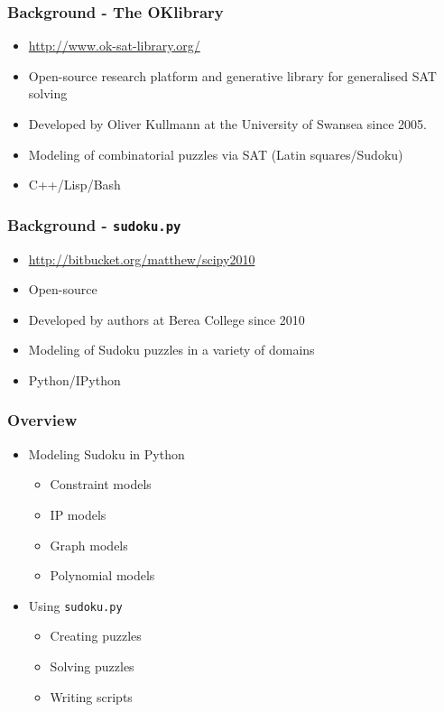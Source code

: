 \documentclass{beamer}
\title{\talktitle}
\author{\Us}
\date{\talkdate}
\begin{document}
\begin{frame}
  \titlepage
  \conferencebanner
\end{frame}

\begin{frame}
\frametitle{Background - The OKlibrary}
 \begin{itemize}
  \item<1-> \url{http://www.ok-sat-library.org/}
  \item<2-> Open-source research platform and generative library for generalised SAT solving
  \item<3-> Developed by Oliver Kullmann at the University of Swansea since 2005.
  \item<4-> Modeling of combinatorial puzzles via SAT (Latin squares/Sudoku)
  \item<5-> C++/Lisp/Bash
 \end{itemize}
\end{frame}

\begin{frame}
\frametitle{Background - \texttt{sudoku.py}}
 \begin{itemize}
  \item<1-> \url{http://bitbucket.org/matthew/scipy2010}
  \item<2-> Open-source 
  \item<3-> Developed by authors at Berea College since 2010
  \item<4-> Modeling of Sudoku puzzles in a variety of domains
  \item<5-> Python/IPython
 \end{itemize}
\end{frame}

\begin{frame}
\frametitle{Overview}
 \begin{itemize}
  \item<1-> {Modeling Sudoku in Python
    \begin{itemize}
      \item<2-> Constraint models
      \item<3-> IP models
      \item<4-> Graph models
      \item<5-> Polynomial models
    \end{itemize}}
  \item<6-> {Using \texttt{sudoku.py} 
    \begin{itemize}
      \item<7-> Creating puzzles
      \item<8-> Solving puzzles
      \item<9-> Writing scripts
    \end{itemize}}
 \end{itemize}
\end{frame}
\end{document}
